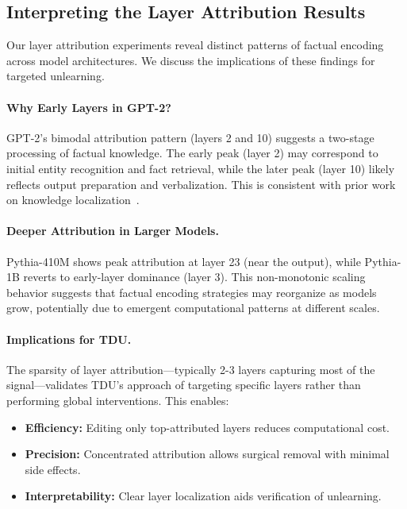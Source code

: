 \label{sec:analysis}

\subsection{Interpreting the Layer Attribution Results}
\label{sec:interpretation}

Our layer attribution experiments reveal distinct patterns of factual encoding across model architectures. We discuss the implications of these findings for targeted unlearning.

\paragraph{Why Early Layers in GPT-2?}
GPT-2's bimodal attribution pattern (layers 2 and 10) suggests a two-stage processing of factual knowledge. The early peak (layer 2) may correspond to initial entity recognition and fact retrieval, while the later peak (layer 10) likely reflects output preparation and verbalization. This is consistent with prior work on knowledge localization~\citep{meng2022locating,geva2023dissecting}.

\paragraph{Deeper Attribution in Larger Models.}
Pythia-410M shows peak attribution at layer 23 (near the output), while Pythia-1B reverts to early-layer dominance (layer 3). This non-monotonic scaling behavior suggests that factual encoding strategies may reorganize as models grow, potentially due to emergent computational patterns at different scales.

\paragraph{Implications for TDU.}
The sparsity of layer attribution---typically 2-3 layers capturing most of the signal---validates TDU's approach of targeting specific layers rather than performing global interventions. This enables:
\begin{itemize}
    \item \textbf{Efficiency:} Editing only top-attributed layers reduces computational cost.
    \item \textbf{Precision:} Concentrated attribution allows surgical removal with minimal side effects.
    \item \textbf{Interpretability:} Clear layer localization aids verification of unlearning.
\end{itemize}

